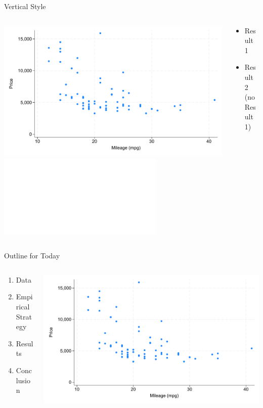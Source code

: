 \documentclass[aspectratio=169,11pt]{beamer}
\begin{document}
\begin{frame}{Vertical Style}
    \begin{columns}[T] %
        \begin{column}{.55\textwidth}
            \begin{center}
                {
                \includegraphics<1>[width=\textwidth]{fig/scatter.pdf}%
                \includegraphics<2>[width=\textwidth]{fig/hist.pdf}%
                }
            \end{center}
        \end{column}
        \begin{column}{.45\textwidth}
            \begin{itemize}
                \item<1> Result 1
                \item<2> Result 2 (no Result 1)
            \end{itemize}
        \end{column}
    \end{columns}    
\end{frame}

\begin{frame}{Outline for Today}
    \begin{columns}[c] %
        \begin{column}{.45\textwidth}
            \begin{enumerate}
                \item Data
                \item Empirical Strategy
                \item Results
                \item Conclusion
            \end{enumerate}
        \end{column}
        \begin{column}{.45\textwidth}
            \begin{center}
                \includegraphics[width=\textwidth]{fig/scatter.pdf}%
            \end{center}
        \end{column}
    \end{columns}    
\end{frame}
\end{document}

